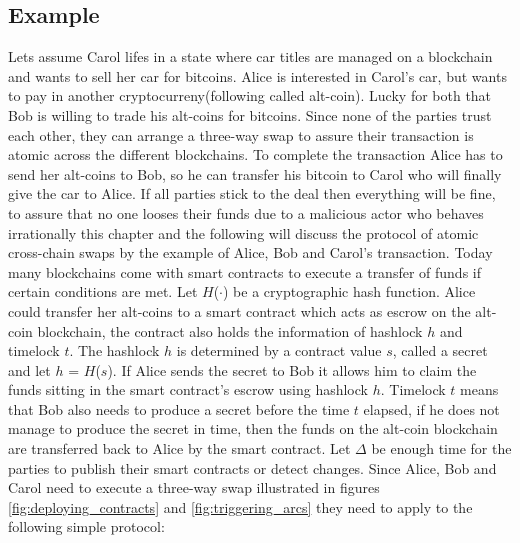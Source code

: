 

\subsection{Example}
\label{subsec:background:second_section:example}

Lets assume Carol lifes in a state where car titles are managed on a blockchain and wants to sell her car for bitcoins. Alice is interested in Carol's car, but wants to pay in another cryptocurreny(following called alt-coin). Lucky for both that Bob is willing to trade his alt-coins for bitcoins. Since none of the parties trust each other, they can arrange a three-way swap to assure their transaction is atomic across the different blockchains. To complete the transaction Alice has to send her alt-coins to Bob, so he can transfer his bitcoin to Carol who will finally give the car to Alice. If all parties stick to the deal then everything will be fine, to assure that no one looses their funds due to a malicious actor who behaves irrationally this chapter and the following will discuss the protocol of atomic cross-chain swaps by the example of Alice, Bob and Carol's transaction. Today many blockchains come with smart contracts to execute a transfer of funds if certain conditions are met.
Let $H$($\cdot$) be a cryptographic hash function. Alice could transfer her alt-coins to a smart contract which acts as escrow on the alt-coin blockchain, the contract also holds the information of hashlock $h$ and timelock $t$. The hashlock $h$ is determined by a contract value $s$, called a secret and let $h$ = $H$($s$). If Alice sends the secret to Bob it allows him to claim the funds sitting in the smart contract's escrow using hashlock $h$. Timelock $t$ means that Bob also needs to produce a secret before the time $t$ elapsed, if he does not manage to produce the secret in time, then the funds on the alt-coin blockchain are transferred back to Alice by the smart contract. Let $\Delta$ be enough time for the parties to publish their smart contracts or detect changes. Since Alice, Bob and Carol need to execute a three-way swap illustrated in figures \ref{fig:deploying_contracts} and \ref{fig:triggering_arcs} they need to apply to the following simple protocol: \newline


